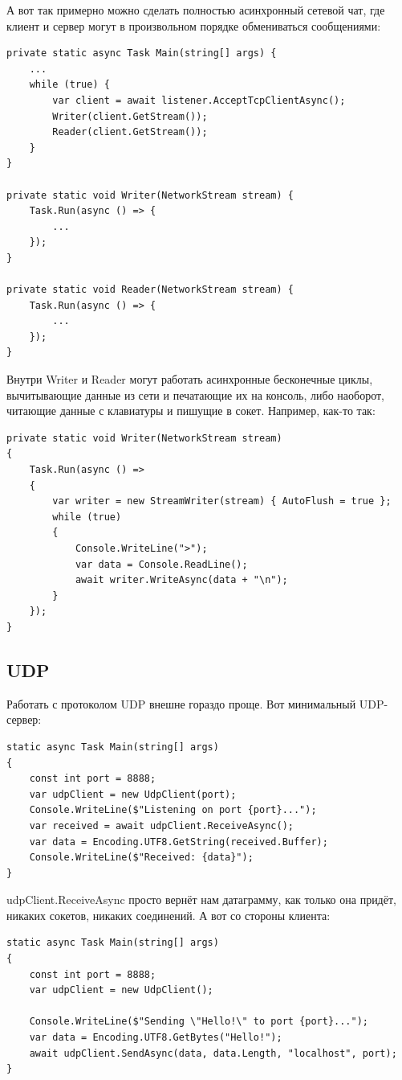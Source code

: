 \documentclass{../../text-style}
\begin{document}
А вот так примерно можно сделать полностью асинхронный сетевой чат, где клиент и сервер могут в произвольном порядке обмениваться сообщениями:

\begin{verbatim}
private static async Task Main(string[] args) {
    ...
    while (true) {
        var client = await listener.AcceptTcpClientAsync();
        Writer(client.GetStream());
        Reader(client.GetStream());
    }
}

private static void Writer(NetworkStream stream) {
    Task.Run(async () => {
        ...
    });
}

private static void Reader(NetworkStream stream) {
    Task.Run(async () => {
        ...
    });
}
\end{verbatim}

Внутри Writer и Reader могут работать асинхронные бесконечные циклы, вычитывающие данные из сети и печатающие их на консоль, либо наоборот, читающие данные с клавиатуры и пишущие в сокет. Например, как-то так:

\begin{verbatim}
private static void Writer(NetworkStream stream)
{
    Task.Run(async () =>
    {
        var writer = new StreamWriter(stream) { AutoFlush = true };
        while (true)
        {
            Console.WriteLine(">");
            var data = Console.ReadLine();
            await writer.WriteAsync(data + "\n");
        }
    });
}
\end{verbatim}

\subsection{UDP}

Работать с протоколом UDP внешне гораздо проще. Вот минимальный UDP-сервер:

\begin{verbatim}
static async Task Main(string[] args)
{
    const int port = 8888;
    var udpClient = new UdpClient(port);
    Console.WriteLine($"Listening on port {port}...");
    var received = await udpClient.ReceiveAsync();
    var data = Encoding.UTF8.GetString(received.Buffer);
    Console.WriteLine($"Received: {data}");
}
\end{verbatim}

udpClient.ReceiveAsync просто вернёт нам датаграмму, как только она придёт, никаких сокетов, никаких соединений. А вот со стороны клиента: 

\begin{verbatim}
static async Task Main(string[] args)
{
    const int port = 8888;
    var udpClient = new UdpClient();

    Console.WriteLine($"Sending \"Hello!\" to port {port}...");
    var data = Encoding.UTF8.GetBytes("Hello!");
    await udpClient.SendAsync(data, data.Length, "localhost", port);
}
\end{verbatim}
\end{document}
